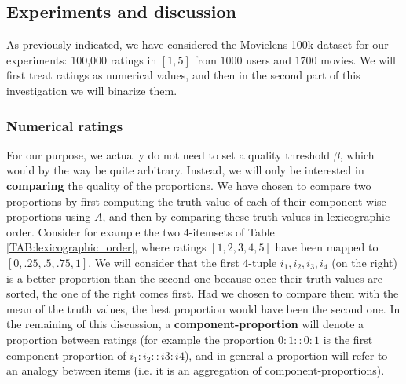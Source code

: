 \subsection{Experiments and discussion}

As previously indicated, we have considered the Movielens-100k dataset for our experiments: 100,000
ratings in $[1, 5]$ from $1000$ users and $1700$ movies. We will first treat
ratings as numerical values, and then in the second part of this investigation
we will binarize them.

\subsubsection{Numerical ratings}

For our purpose, we actually do not need to set a quality threshold $\beta$,
which would by the way be quite arbitrary. Instead, we will only be interested
in \textbf{comparing} the quality of the  proportions. We have chosen to compare two proportions by first
computing the truth value of each of their component-wise proportions using
$A$, and then by comparing these truth values in lexicographic order. Consider
for example the two $4$-itemsets of Table \ref{TAB:lexicographic_order}, where
ratings $[1, 2, 3, 4, 5]$ have been mapped to $[0, .25, .5, .75, 1]$. We
will consider that the first $4$-tuple $i_1, i_2, i_3, i_4$ (on the right) is a better proportion
than the second one because once their truth values are sorted, the one of the
right comes first. Had we chosen to compare them with the mean of the truth
values, the best proportion would have been the second one. In the remaining of
this discussion, a \textbf{component-proportion} will denote a proportion
between ratings (for example the proportion $0:1::0:1$ is the first
component-proportion of $i_1:i_2::i3:i4$), and in general a proportion  will
refer to an analogy between items (i.e. it is an aggregation of
component-proportions).


